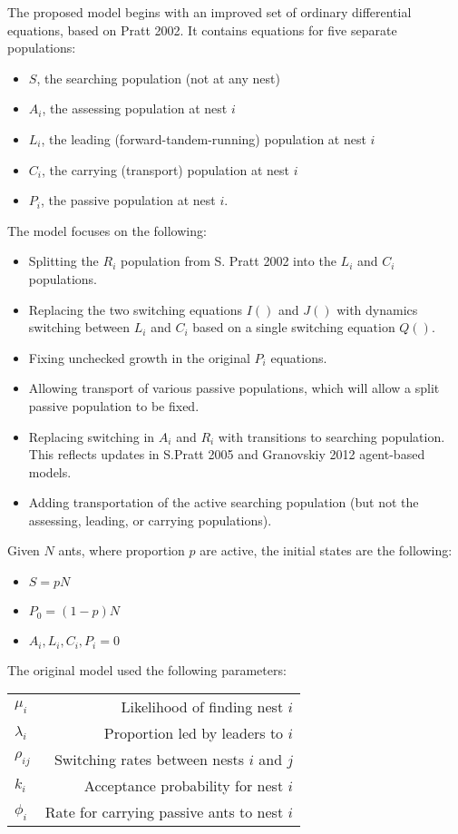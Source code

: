 \documentclass[letterpaper]{article}
\begin{document}
  The proposed model begins with an improved set of ordinary differential equations, based on Pratt 2002.
  It contains equations for five separate populations: 
  \begin{itemize}
      \item $S$, the searching population (not at any nest)
      \item $A_i$, the assessing population at nest $i$
      \item $L_i$, the leading (forward-tandem-running) population at nest $i$
      \item $C_i$, the carrying (transport) population at nest $i$
      \item $P_i$, the passive population at nest $i$. 
  \end{itemize}
  The model focuses on the following:
  \begin{itemize}
      \item Splitting the $R_i$ population from S. Pratt 2002 into the $L_i$ and $C_i$ populations.
      \item Replacing the two switching equations $I()$ and $J()$ with dynamics switching between $L_i$ and $C_i$ based on a single switching equation $Q()$.
      \item Fixing unchecked growth in the original $P_i$ equations.
      \item Allowing transport of various passive populations, which will allow a split passive population to be fixed.
      \item Replacing switching in $A_i$ and $R_i$ with transitions to searching population. This reflects updates in S.Pratt 2005 and Granovskiy 2012 agent-based models.
      \item Adding transportation of the active searching population (but not the assessing, leading, or carrying populations).
  \end{itemize}

  Given $N$ ants, where proportion $p$ are active, the initial states are the following:
  \begin{itemize}
      \item $S = pN$
      \item $P_0 = (1-p)N$ 
      \item $A_i, L_i, C_i, P_i = 0$ 
  \end{itemize}

  The original model used the following parameters:\\

\begin{tabular}{ l | r }
    \hline
  $\mu_i$     & Likelihood of finding nest $i$\\
  $\lambda_i$ & Proportion led by leaders to $i$\\
  $\rho_{ij}$ & Switching rates between nests $i$ and $j$\\
  $k_i$       & Acceptance probability for nest $i$\\
  $\phi_i$    & Rate for carrying passive ants to nest $i$\\
    \hline
\end{tabular} \\
\end{document}
